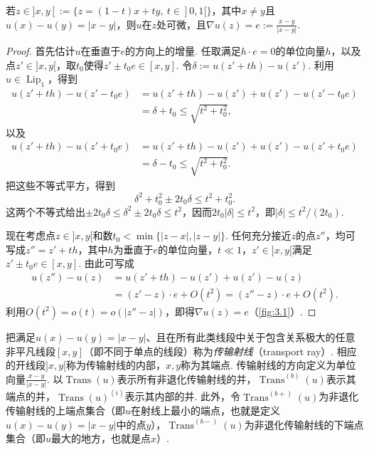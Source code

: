 \begin{lemma}\label{obj:3.6}
若$z\in]x,y[:=\{z=(1-t)x+ty,\ t\in]0,1[\}$，其中$x\ne y$且$u(x)-u(y)=|x-y|$，则$u$在$z$处可微，且$\nabla u(z)=e:=\frac{x-y}{|x-y|}$.
\end{lemma}
\begin{proof}
首先估计$u$在垂直于$e$的方向上的增量. 任取满足$h\cdot e=0$的单位向量$h$，以及点$z'\in]x,y[$，取$t_0$使得$z'\pm t_0e\in[x,y]$. 令$\delta:=u(z'+th)-u(z')$. 利用$u\in\operatorname{Lip}_1$，得到
\begin{equation*}
\begin{aligned}
u(z'+th)-u(z'-t_0e)
&=u(z'+th)-u(z')+u(z')-u(z'-t_0e)\\
&=\delta+t_0\le\sqrt{t^2+t_0^2},
\end{aligned}
\end{equation*}
以及
\begin{equation*}
\begin{aligned}
u(z'+th)-u(z'+t_0e)
&=u(z'+th)-u(z')+u(z')-u(z'+t_0e)\\
&=\delta-t_0\le\sqrt{t^2+t_0^2}.
\end{aligned}
\end{equation*}
把这些不等式平方，得到
\[
\delta^2+t_0^2\pm2t_0\delta\le t^2+t_0^2.
\]
这两个不等式给出$\pm2t_0\delta\le\delta^2\pm2t_0\delta\le t^2$，因而$2t_0|\delta|\le t^2$，即$|\delta|\le t^2/(2t_0)$.

现在考虑点$z\in]x,y[$和数$t_0<\min\{|z-x|,|z-y|\}$. 任何充分接近$z$的点$z''$，均可写成$z''=z'+th$，其中$h$为垂直于$e$的单位向量，$t\ll1$，$z'\in]x,y[$满足$z'\pm t_0e\in[x,y]$. 由此可写成
\begin{equation*}
\begin{aligned}
u(z'')-u(z)&=u(z'+th)-u(z')+u(z')-u(z)\\
&=(z'-z)\cdot e+O(t^2)=(z''-z)\cdot e+O(t^2).
\end{aligned}
\end{equation*}
利用$O(t^2)=o(t)=o(|z''-z|)$，即得$\nabla u(z)=e$（\autoref{fig:3.1}）.
\end{proof}

\begin{definition}\label{obj:3.7}
把满足$u(x)-u(y)=|x-y|$、且在所有此类线段中关于包含关系极大的任意非平凡线段$[x,y]$（即不同于单点的线段）称为\emph{传输射线}（transport ray）. 相应的开线段$]x,y[$称为传输射线的内部，$x,y$称为其端点. 传输射线的方向定义为单位向量$\frac{x-y}{|x-y|}$. 以$\operatorname{Trans}(u)$表示所有非退化传输射线的并，$\operatorname{Trans}^{(b)}(u)$表示其端点的并，$\operatorname{Trans}(u)^{(i)}$表示其内部的并. 此外，令$\operatorname{Trans}^{(b+)}(u)$为非退化传输射线的上端点集合（即$u$在射线上最小的端点，也就是定义$u(x)-u(y)=|x-y|$中的点$y$），$\operatorname{Trans}^{(b-)}(u)$为非退化传输射线的下端点集合（即$u$最大的地方，也就是点$x$）.
\end{definition}

